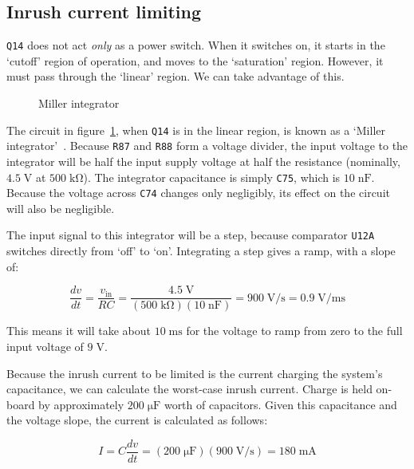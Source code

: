 \documentclass[article]{memoir}
\newcommand{\refdes}[1]{\texttt{#1}}
\newcommand{\mr}[1]{\ensuremath{\mathrm{#1}}}
\begin{document}
\begin{multicols}{2}
\subsection{Inrush current limiting}

\refdes{Q14} does not act \emph{only} as a power switch. When it switches on,
it starts in the `cutoff' region of operation, and moves to the `saturation'
region. However, it must pass through the `linear' region. We can take
advantage of this.

\begin{figure}[H]
\centering
{}
\caption{Miller integrator}
\label{fig:miller}
\end{figure}

The circuit in figure~\ref{fig:miller}, when \refdes{Q14} is in the linear
region, is known as a `Miller integrator'~\cite[pg. 283]{tranckts-sawtooth}.
Because \texttt{R87} and \texttt{R88} form a voltage divider, the input
voltage to the integrator will be half the input supply voltage at half
the resistance (nominally, $4.5\;\mr{V}$ at $500\;\mr{k\Omega}$). The
integrator capacitance is simply \texttt{C75}, which is $10\;\mr{nF}$.
Because the voltage across \texttt{C74} changes only negligibly, its effect
on the circuit will also be negligible.

The input signal to this integrator will be a step, because comparator
\texttt{U12A} switches directly from `off' to `on'. Integrating a step gives
a ramp, with a slope of:

\begin{equation*}
    \frac{dv}{dt} = \frac{v_\mr{in}}{RC} = \frac{4.5\;\mr{V}}{(500\;\mr{k\Omega})(10\;\mr{nF})}
    = 900\;\mr{V/s} = 0.9\;\mr{V/ms}
\end{equation*}

This means it will take about $10\;\mr{ms}$ for the voltage to ramp from zero
to the full input voltage of $9\;\mr{V}$.

Because the inrush current to be limited is the current charging the system's
capacitance, we can calculate the worst-case inrush current. Charge is held
on-board by approximately $200\;\mr{\mu F}$ worth of capacitors. Given this
capacitance and the voltage slope, the current is calculated as follows:

\begin{equation*}
    I = C \frac{dv}{dt} = (200\;\mr{\mu F})(900\;\mr{V/s}) = 180\;\mr{mA}
\end{equation*}


\end{multicols}
\end{document}
